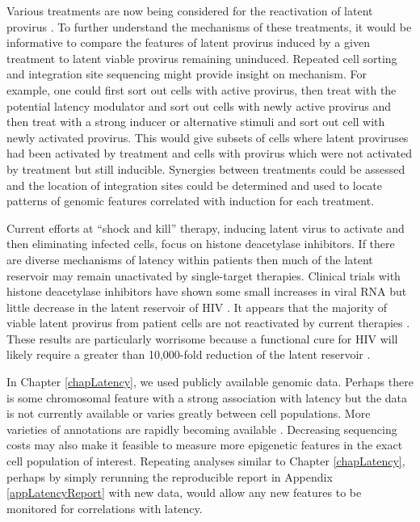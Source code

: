 \documentclass[../sherrill-Mix_thesis.tex]{subfiles}
\begin{document}
	Various treatments are now being considered for the reactivation of latent provirus \citep{Spina2013}. To further understand the mechanisms of these treatments, it would be informative to compare the features of latent provirus induced by a given treatment to latent viable provirus remaining uninduced. Repeated cell sorting and integration site sequencing might provide insight on mechanism. For example, one could first sort out cells with active provirus, then treat with the potential latency modulator and sort out cells with newly active provirus and then treat with a strong inducer or alternative stimuli and sort out cell with newly activated provirus. This would give subsets of cells where latent proviruses had been activated by treatment and cells with provirus which were not activated by treatment but still inducible. Synergies between treatments could be assessed and the location of integration sites could be determined and used to locate patterns of genomic features correlated with induction for each treatment.

	Current efforts at ``shock and kill'' therapy, inducing latent virus to activate and then eliminating infected cells, focus on histone deacetylase inhibitors. If there are diverse mechanisms of latency within patients then much of the latent reservoir may remain unactivated by single-target therapies.  Clinical trials with histone deacetylase inhibitors have shown some small increases in viral RNA but little decrease in the latent reservoir of HIV \citep{Lehrman2005,Archin2010,Archin2012,Spivak2014}. It appears that the majority of viable latent provirus from patient cells are not reactivated by current therapies \citep{Cillo2014}. These results are particularly worrisome because a functional cure for HIV will likely require a greater than 10,000-fold reduction of the latent reservoir \citep{Hill2014}. %

	In Chapter \ref{chapLatency}, we used publicly available genomic data. Perhaps there is some chromosomal feature with a strong association with latency but the data is not currently available or varies greatly between cell populations. More varieties of annotations are rapidly becoming available \citep{ENCODEPC2012,Barrett2013,Karolchik2014,Goldman2015,Cunningham2015}. Decreasing sequencing costs \citep{Metzker2010,Mardis2011,Wetterstrand2015} may also make it feasible to measure more epigenetic features in the exact cell population of interest. Repeating analyses similar to Chapter \ref{chapLatency}, perhaps by simply rerunning the reproducible report in Appendix \ref{appLatencyReport} with new data, would allow any new features to be monitored for correlations with latency.
\end{document}
